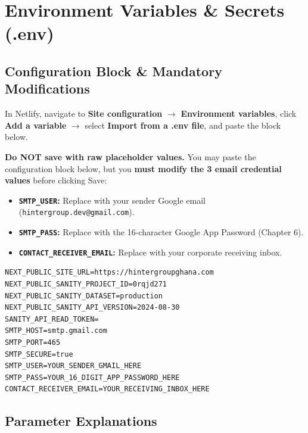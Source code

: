 \documentclass[11pt,a4paper,oneside]{book}
\begin{document}
\chapter{Environment Variables \& Secrets (.env)}

\section{Configuration Block \& Mandatory Modifications}
In Netlify, navigate to \textbf{Site configuration} $\rightarrow$ \textbf{Environment variables}, click \textbf{Add a variable} $\rightarrow$ select \textbf{Import from a .env file}, and paste the block below.

\begin{confidentialbox}
\textbf{Do NOT save with raw placeholder values.} You may paste the configuration block below, but you \textbf{must modify the 3 email credential values} before clicking Save:
\begin{itemize}[leftmargin=1.0cm,noitemsep,topsep=1pt]
  \item \textbf{\texttt{SMTP\_USER}:} Replace with your sender Google email (\texttt{hintergroup.dev@gmail.com}).
  \item \textbf{\texttt{SMTP\_PASS}:} Replace with the 16-character Google App Password (Chapter 6).
  \item \textbf{\texttt{CONTACT\_RECEIVER\_EMAIL}:} Replace with your corporate receiving inbox.
\end{itemize}
\end{confidentialbox}

\vspace{-0.15cm}
\begin{lstlisting}[basicstyle=\scriptsize\ttfamily\color{white},framesep=5pt]
NEXT_PUBLIC_SITE_URL=https://hintergroupghana.com
NEXT_PUBLIC_SANITY_PROJECT_ID=0rqjd271
NEXT_PUBLIC_SANITY_DATASET=production
NEXT_PUBLIC_SANITY_API_VERSION=2024-08-30
SANITY_API_READ_TOKEN=
SMTP_HOST=smtp.gmail.com
SMTP_PORT=465
SMTP_SECURE=true
SMTP_USER=YOUR_SENDER_GMAIL_HERE
SMTP_PASS=YOUR_16_DIGIT_APP_PASSWORD_HERE
CONTACT_RECEIVER_EMAIL=YOUR_RECEIVING_INBOX_HERE
\end{lstlisting}

\vspace{-0.1cm}
\section{Parameter Explanations}
\vspace{-0.1cm}
\end{document}
